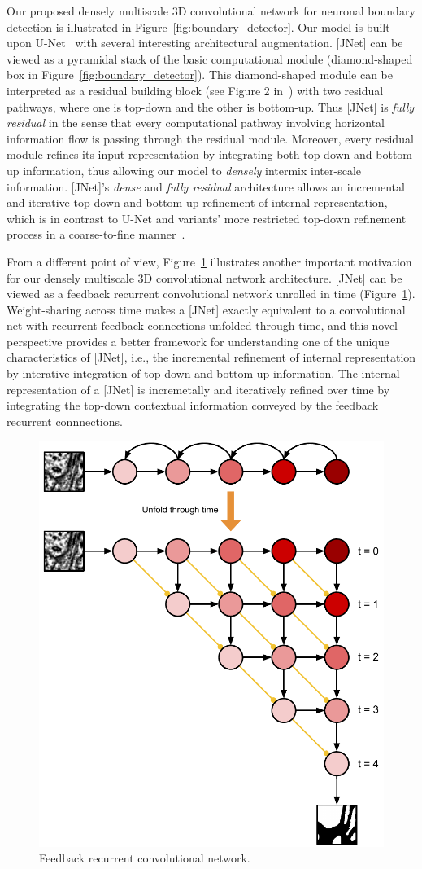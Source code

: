 \documentclass{article}
\begin{document}
\begin{appendices}
Our proposed densely multiscale 3D convolutional network for neuronal boundary
detection is illustrated in Figure~\ref{fig:boundary_detector}. Our model is
built upon U-Net~\cite{unet} with several interesting architectural
augmentation. [JNet] can be viewed as a pyramidal stack of the basic
computational module (diamond-shaped box in Figure~\ref{fig:boundary_detector}).
This diamond-shaped module can be interpreted as a residual building block (see
Figure 2 in~\cite{resnet}) with two residual pathways, where one is top-down and
the other is bottom-up. Thus [JNet] is \emph{fully residual} in the sense that
every computational pathway involving horizontal information flow is passing
through the residual module. Moreover, every residual module refines its input
representation by integrating both top-down and bottom-up information, thus
allowing our model to \emph{densely} intermix inter-scale information. [JNet]'s
\emph{dense} and \emph{fully residual} architecture allows an incremental and
iterative top-down and bottom-up refinement of internal representation, which is
in contrast to U-Net and variants' more restricted top-down refinement process in a
coarse-to-fine manner~\cite{pinheiro2016refine,lin2016pyramid}.

From a different point of view, Figure~\ref{fig:unfold} illustrates another
important motivation for our densely multiscale 3D convolutional network
architecture. [JNet] can be viewed as a feedback recurrent convolutional network
unrolled in time (Figure~\ref{fig:unfold}). Weight-sharing across time makes a
[JNet] exactly equivalent to a convolutional net with recurrent feedback
connections unfolded through time, and this novel perspective provides a better
framework for understanding one of the unique characteristics of [JNet], i.e.,
the incremental refinement of internal representation by interative integration
of top-down and bottom-up information. The internal representation of a [JNet]
is incremetally and iteratively refined over time by integrating the top-down
contextual information conveyed by the feedback recurrent connnections.   

\begin{figure}[!t]
\centering
\includegraphics[width=0.6\linewidth]{unfold.pdf}
\caption{Feedback recurrent convolutional network.}
\label{fig:unfold}
\end{figure}


\end{appendices}
\end{document}

